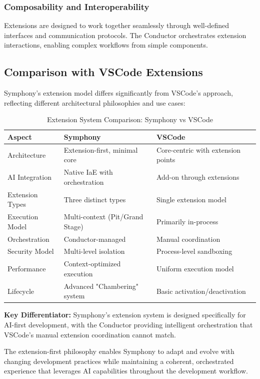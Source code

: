 \subsubsection{Composability and Interoperability}
\label{subsubsec:composability-interoperability}

Extensions are designed to work together seamlessly through well-defined interfaces and communication protocols. The Conductor orchestrates extension interactions, enabling complex workflows from simple components.

\subsection{Comparison with VSCode Extensions}
\label{subsec:vscode-comparison}

Symphony's extension model differs significantly from VSCode's approach, reflecting different architectural philosophies and use cases:

\begin{table}[h]
\centering
\caption{Extension System Comparison: Symphony vs VSCode}
\label{tab:extension-comparison}
\begin{tabular}{@{}lll@{}}
\toprule
\textbf{Aspect} & \textbf{Symphony} & \textbf{VSCode} \\
\midrule
Architecture & Extension-first, minimal core & Core-centric with extension points \\
AI Integration & Native IaE with orchestration & Add-on through extensions \\
Extension Types & Three distinct types & Single extension model \\
Execution Model & Multi-context (Pit/Grand Stage) & Primarily in-process \\
Orchestration & Conductor-managed & Manual coordination \\
Security Model & Multi-level isolation & Process-level sandboxing \\
Performance & Context-optimized execution & Uniform execution model \\
Lifecycle & Advanced "Chambering" system & Basic activation/deactivation \\
\bottomrule
\end{tabular}
\end{table}

\begin{alertbox}
\textbf{Key Differentiator:} Symphony's extension system is designed specifically for AI-first development, with the Conductor providing intelligent orchestration that VSCode's manual extension coordination cannot match.
\end{alertbox}

The extension-first philosophy enables Symphony to adapt and evolve with changing development practices while maintaining a coherent, orchestrated experience that leverages AI capabilities throughout the development workflow.
